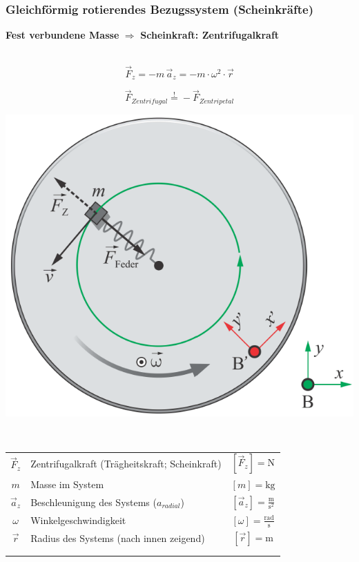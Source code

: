 	
	\vfill\null
	\columnbreak
	
	
	
	\subsubsection{Gleichförmig rotierendes Bezugssystem (Scheinkräfte)}
	
	
	\textbf{Fest verbundene Masse} $\Rightarrow$ \textbf{Scheinkraft: Zentrifugalkraft} \\
	\\
	\begin{minipage}{0.48\linewidth}
	$$ \boxed{ \vec{F}_z = - m \, \vec{a}_z = - m \cdot \omega^2 \cdot \vec{r} }$$ 
	
	$$ \boxed{ \vec{F}_{Zentrifugal}  \overset{!}{=} - \vec{F}_{Zentripetal} }$$ 
	\end{minipage}
	\hfill
	\begin{minipage}{0.48\linewidth}
	\includegraphics[width=0.75\linewidth]{Bilder/zentrifugalkraft} \\
	\end{minipage}
	\\
	
	\begin{tabular}{c l c}
	$\vec{F}_z$ & Zentrifugalkraft (Trägheitskraft; Scheinkraft) & $[\vec{F}_z] = \mathrm{N}$ \\
	$m$ & Masse im System & $[m] = \mathrm{kg}$ \\
	$\vec{a}_z$ & Beschleunigung des Systems ($a_{radial}$) & $[\vec{a}_z] = \mathrm{\frac{m}{s^2}}$ \\
	$\omega$ & Winkelgeschwindigkeit & $[\omega] = \mathrm{\frac{rad}{s}}$ \\
	$\vec{r}$ & Radius des Systems (nach innen zeigend) & $[\vec{r}] = \mathrm{m}$ \\ 
	\\
	\\
	\end{tabular}
	
